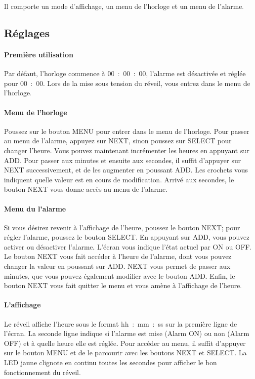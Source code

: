 \documentclass[12pt,a4paper]{article}
\begin{document}
Il comporte un mode d'affichage, un menu de l'horloge et un menu de l'alarme.

\subsection{Réglages}

\paragraph{Première utilisation}
Par défaut, l'horloge commence à 00~:~00~:~00, l'alarme est désactivée et réglée pour 00~:~00. Lors de la mise sous tension du réveil, vous entrez dans le menu de l'horloge.

\paragraph{Menu de l'horloge} Poussez sur le bouton MENU pour entrer dans le menu de l'horloge. Pour passer au menu de l'alarme, appuyez sur NEXT, sinon poussez sur SELECT pour changer l'heure.
Vous pouvez maintenant incrémenter les heures en appuyant sur ADD. Pour passer aux minutes et ensuite aux secondes, il suffit d'appuyer sur NEXT successivement, et de les augmenter en poussant ADD. Les crochets vous indiquent quelle valeur est en cours de modification.
Arrivé aux secondes, le bouton NEXT vous donne accès au menu de l'alarme.

\paragraph{Menu du l'alarme} Si vous désirez revenir à l'affichage de l'heure, poussez le bouton NEXT; pour régler l'alarme, poussez le bouton SELECT. En appuyant sur ADD, vous pouvez activer ou désactiver l'alarme. L'écran vous indique l'état actuel par ON ou OFF. Le bouton NEXT vous fait accéder à l'heure de l'alarme, dont vous pouvez changer la valeur en poussant sur ADD. NEXT vous permet de passer aux minutes, que vous pouvez également modifier avec le bouton ADD. Enfin, le bouton NEXT vous fait quitter le menu et vous amène à l'affichage de l'heure.

\paragraph{L'affichage}
Le réveil affiche l'heure sous le format hh~:~mm~:~ss sur la première ligne de l'écran. La seconde ligne indique si l'alarme est mise (Alarm ON) ou non (Alarm OFF) et à quelle heure elle est réglée. Pour accéder au menu, il suffit d'appuyer sur le bouton MENU et de le parcourir avec les boutons NEXT et SELECT. La LED jaune clignote en continu toutes les secondes pour afficher le bon fonctionnement du réveil.
\end{document}
